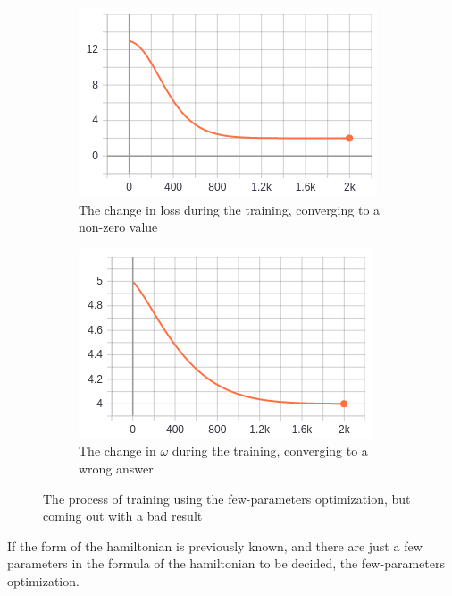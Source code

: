 \documentclass{article}
\begin{document}
\begin{figure}
	\centering
	\begin{subfigure}[b]{0.4\linewidth}
		\includegraphics[width=\linewidth]{few_param_loss_bad.png}
		\caption{The change in loss during the training, converging to a non-zero value}
	\end{subfigure}
	\begin{subfigure}[b]{0.4\linewidth}
		\includegraphics[width=\linewidth]{few_param_omega_bad.png}
		\caption{The change in $\omega$ during the training, converging to a wrong answer}
	\end{subfigure}
	\caption{The process of training using the few-parameters optimization, but coming out with a bad result}
	\label{fig:few_param_bad}
\end{figure}

If the form of the hamiltonian is previously known,
and there are just a few parameters in the formula of the hamiltonian to be decided,
the few-parameters optimization.
\end{document}
